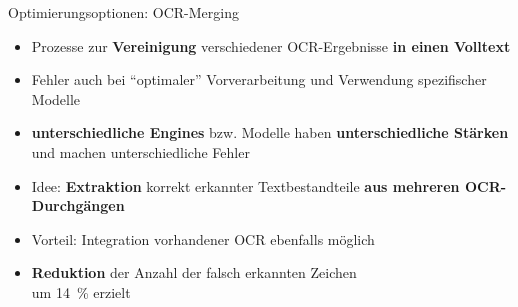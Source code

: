 \documentclass{bbawslides}
\begin{document}
\begin{bbawslide}{Optimierungsoptionen: OCR-Merging}
  \vspace*{7mm}%
  \centerslidestrue%
  \begin{itemize}
    \item Prozesse zur \textbf{Vereinigung} verschiedener OCR-Ergebnisse \textbf{in einen Volltext}
    \item Fehler auch bei \enquote{optimaler} Vorverarbeitung und Verwendung spezifischer Modelle
    \item \textbf{unterschiedliche Engines} bzw. Modelle haben \textbf{unterschiedliche Stärken} und machen unterschiedliche Fehler
    \item Idee: \textbf{Extraktion} korrekt erkannter Textbestandteile \textbf{aus mehreren OCR-Durchgängen} 
    \item Vorteil: Integration vorhandener OCR ebenfalls möglich
    \item \textbf{Reduktion} der Anzahl der falsch erkannten Zeichen\\um 14~\% erzielt  
  \end{itemize}
\end{bbawslide}
\end{document}
